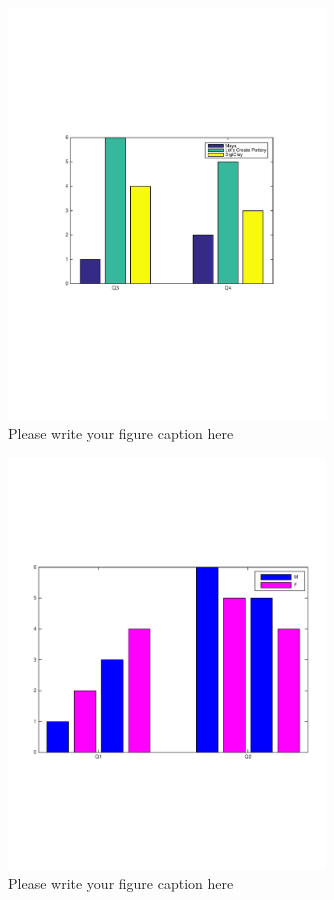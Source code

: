 \begin{figure}
  \includegraphics[width=0.75\textwidth]{f8.pdf}
\caption{Please write your figure caption here}
\label{fig:1}       %
\end{figure}

\begin{figure}
  \includegraphics[width=0.75\textwidth]{f9.pdf}
\caption{Please write your figure caption here}
\label{fig:1}       %
\end{figure}


